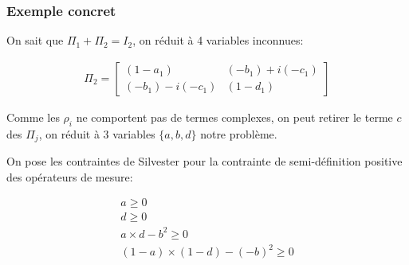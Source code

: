 \documentclass{beamer}
\begin{document}
\begin{frame}
    \frametitle{Exemple concret}
    \small
    \begin{block}{}


        On sait que $\Pi_1 + \Pi_2 = I_2$, on réduit à 4 variables inconnues:

        \begin{align}
            \Pi_2 = \begin{bmatrix}
                (1-a_1) & (-b_1) + i(-c_1) \\ (-b_1) - i(-c_1) & (1-d_1)
            \end{bmatrix} \nonumber
        \end{align}

        Comme les $\rho_i$ ne comportent pas de termes complexes, on peut retirer le terme $c$ des $\Pi_j$, on réduit à 3 variables $\{a, b, d\}$ notre problème.

        On pose les contraintes de Silvester pour la contrainte de semi-définition positive des opérateurs de mesure:

        \begin{align}
            a \geq 0 \nonumber \\
            d \geq 0 \nonumber \\
            a \times d - b^2 \geq 0 \nonumber \\
            (1-a) \times (1-d) - (-b)^2 \geq 0 \nonumber
        \end{align}
    \end{block}
\end{frame}

\end{document}
